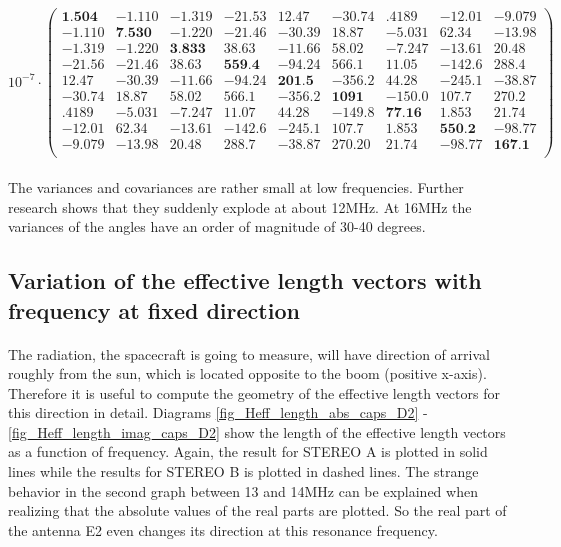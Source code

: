 \documentclass[a4paper,10pt]{thesis}
\begin{document}
\tiny
\begin{equation}\label{cov_1MHz_B}
10^{-7} \cdot \left(
\begin{array}{ccccccccc}
\textbf{1.504} & -1.110 & -1.319 & -21.53 & 12.47 & -30.74 & .4189 & -12.01 & -9.079 \\
 -1.110 & \textbf{7.530} & -1.220 & -21.46 & -30.39 & 18.87 & -5.031 & 62.34 & -13.98 \\
 -1.319 & -1.220 & \textbf{3.833} & 38.63 & -11.66 & 58.02 & -7.247 & -13.61 & 20.48 \\
 -21.56 & -21.46 & 38.63 & \textbf{559.4} & -94.24 & 566.1 & 11.05 & -142.6 & 288.4 \\
 12.47 & -30.39 & -11.66 & -94.24 & \textbf{201.5} & -356.2 & 44.28 & -245.1 & -38.87\\
 -30.74 & 18.87 & 58.02 & 566.1 & -356.2 & \textbf{1091} & -150.0 & 107.7 & 270.2 \\
 .4189 & -5.031 & -7.247 & 11.07 & 44.28 & -149.8 & \textbf{77.16} & 1.853 & 21.74 \\
 -12.01 & 62.34 & -13.61 & -142.6 & -245.1 & 107.7 & 1.853 & \textbf{550.2} & -98.77 \\
 -9.079 & -13.98 & 20.48 & 288.7 & -38.87 & 270.20 & 21.74 & -98.77 & \textbf{167.1} \\
\end{array}%
\right)
\end{equation}
\normalsize


\paragraph*{}
The variances and covariances are rather small at low frequencies. Further research shows that they suddenly explode at about 12MHz. At 16MHz the variances of the angles have an order of magnitude of 30-40 degrees.

\subsection{Variation of the effective length vectors with frequency at fixed direction}
\paragraph*{}
The radiation, the spacecraft is going to measure, will have direction of arrival roughly
from the sun, which is located opposite to the boom (positive
x-axis). Therefore it is useful to compute the geometry of the effective length vectors for this direction in detail. Diagrams \ref{fig_Heff_length_abs_caps_D2} - \ref{fig_Heff_length_imag_caps_D2} show the length of the effective length vectors as a function of
frequency. Again, the result for STEREO A is plotted in solid lines while the results for STEREO B is plotted in dashed lines. The strange behavior in the second graph between 13 and 14MHz can be explained when realizing that the absolute values of the real parts are plotted. So the real part of the antenna E2 even changes its direction at this resonance frequency.
\end{document}
